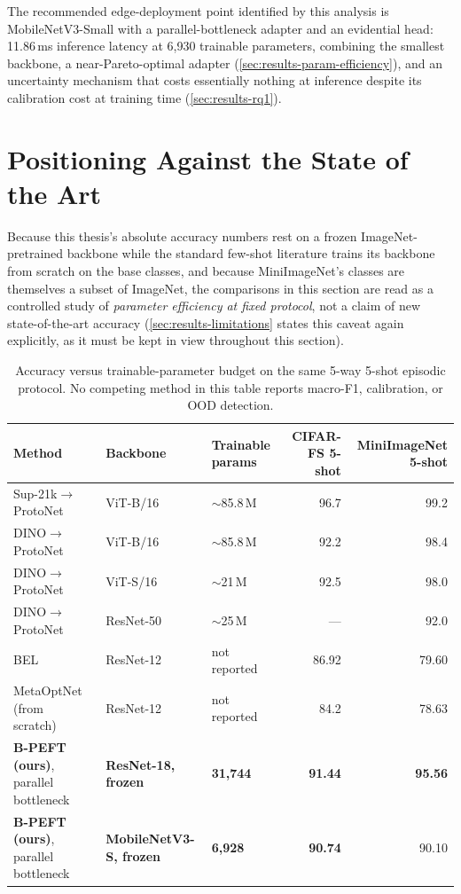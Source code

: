 \documentclass{iutbscthesis}
\begin{document}
The recommended edge-deployment point identified by this analysis is MobileNetV3-Small with a parallel-bottleneck adapter and an evidential head: 11.86\,ms inference latency at 6{,}930 trainable parameters, combining the smallest backbone, a near-Pareto-optimal adapter (\autoref{sec:results-param-efficiency}), and an uncertainty mechanism that costs essentially nothing at inference despite its calibration cost at training time (\autoref{sec:results-rq1}).

\section{Positioning Against the State of the Art}
\label{sec:results-positioning}

Because this thesis's absolute accuracy numbers rest on a frozen ImageNet-pretrained backbone while the standard few-shot literature trains its backbone from scratch on the base classes, and because MiniImageNet's classes are themselves a subset of ImageNet, the comparisons in this section are read as a controlled study of \emph{parameter efficiency at fixed protocol}, not a claim of new state-of-the-art accuracy (\autoref{sec:results-limitations} states this caveat again explicitly, as it must be kept in view throughout this section).

\begin{table}[H]
    \centering
    \footnotesize
    \begin{tabular}{>{\raggedright\arraybackslash}p{4cm} >{\raggedright\arraybackslash}p{2.3cm} >{\raggedright\arraybackslash}p{1.7cm} r r}
        \toprule
        Method & Backbone & Trainable params & CIFAR-FS 5-shot & MiniImageNet 5-shot \\
        \midrule
        Sup-21k$\to$ProtoNet~\cite{hu2022pmf} & ViT-B/16 & $\sim$85.8\,M & 96.7 & 99.2 \\
        DINO$\to$ProtoNet~\cite{caron2021dino,hu2022pmf} & ViT-B/16 & $\sim$85.8\,M & 92.2 & 98.4 \\
        DINO$\to$ProtoNet~\cite{caron2021dino,hu2022pmf} & ViT-S/16 & $\sim$21\,M & 92.5 & 98.0 \\
        DINO$\to$ProtoNet~\cite{caron2021dino,hu2022pmf} & ResNet-50 & $\sim$25\,M & --- & 92.0 \\
        BEL~\cite{linghu2022bel} & ResNet-12 & not reported & 86.92 & 79.60 \\
        MetaOptNet (from scratch)~\cite{lee2019metaoptnet} & ResNet-12 & not reported & 84.2 & 78.63 \\
        \textbf{B-PEFT (ours)}, parallel bottleneck & \textbf{ResNet-18, frozen} & \textbf{31{,}744} & \textbf{91.44} & \textbf{95.56} \\
        \textbf{B-PEFT (ours)}, parallel bottleneck & \textbf{MobileNetV3-S, frozen} & \textbf{6{,}928} & \textbf{90.74} & 90.10 \\
        \bottomrule
    \end{tabular}
    \caption{Accuracy versus trainable-parameter budget on the same 5-way 5-shot episodic protocol. No competing method in this table reports macro-F1, calibration, or OOD detection.}
    \label{tab:positioning-accuracy}
\end{table}
\end{document}
